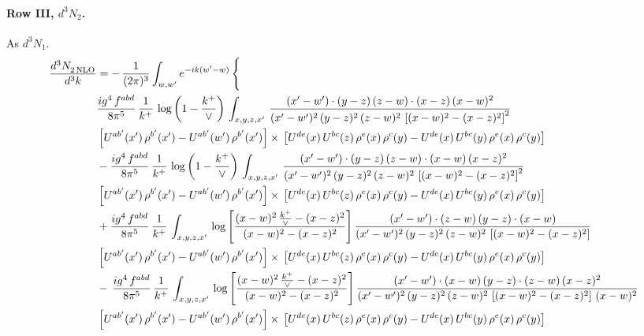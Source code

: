 \documentclass[10pt]{article}
\numberwithin{equation}{section}
\begin{document}
\paragraph{Row III, $d^3N_2$.}
As $d^3N_1$.
\begin{align}
   \frac{d^{3}N_{2\,\rm NLO}^{\rm}}{d^{3}k}  & =  -\,\frac{1}{(2\pi)^{3}}  \int_{w, w^\prime} e^{-ik(w^\prime-w)}\, \Bigg\{\notag \\
&  \frac{ig^{4}\, f^{abd}}{8\pi^{5}}\, \frac{1}{k^{+}}\,\log{\left(1-\frac{k^{+}}{\vee}\right)}\, \int_{x,y,z,x'}\,\frac{(x'-w')\cdot  (y-z)\, (z-w)\cdot (x-z)\, (x-w)^{2}}{(x'-w')^{2}\, (y-z)^{2}\, (z-w)^{2}\,\left[(x-w)^{2}-(x-z)^{2}\right]^{2}}\, \notag \\ & \left[U^{ab'}(x')\,\rho^{b'}(x')-U^{ab'}(w')\, \rho^{b'}(x')\right]\times\,\left[U^{de}(x)\,U^{bc}(z)\, \rho^{e}(x)\,\rho^{c}(y)-U^{de}(x)\,U^{bc}(y)\,\rho^{e}(x)\,\rho^{c}(y)\right] \notag \\
&   - \frac{ig^{4}\, f^{abd}}{8\pi^{5}}\, \frac{1}{k^{+}}\,\log{\left(1-\frac{k^{+}}{\vee}\right)}\, \int_{x,y,z,x'}\,\frac{(x'-w')\cdot  (y-z)\, (z-w)\cdot (x-w)\, (x-z)^{2}}{(x'-w')^{2}\, (y-z)^{2}\, (z-w)^{2}\,\left[(x-w)^{2}-(x-z)^{2}\right]^{2}}\, \notag \\ & \left[U^{ab'}(x')\,\rho^{b'}(x')-U^{ab'}(w')\, \rho^{b'}(x')\right]\times\,\left[U^{de}(x)\,U^{bc}(z)\, \rho^{e}(x)\,\rho^{c}(y)-U^{de}(x)\,U^{bc}(y)\,\rho^{e}(x)\,\rho^{c}(y)\right] \notag \\
&  + \frac{ig^{4}\, f^{abd}}{8\pi^{5}}\, \frac{1}{k^{+}}\, \int_{x,y,z,x'}\,\log{\left[\frac{(x-w)^{2}\,\frac{k^{+}}{\vee}-(x-z)^{2}}{(x-w)^{2}-(x-z)^{2}}\right]}\,\frac{(x'-w')\cdot (z-w)\, (y-z)\cdot (x-w)}{(x'-w')^{2}\, (y-z)^{2}\, (z-w)^{2}\,\left[(x-w)^{2}-(x-z)^{2}\right]}\, \notag \\ & \left[U^{ab'}(x')\,\rho^{b'}(x')-U^{ab'}(w')\, \rho^{b'}(x')\right]\times\,\left[U^{de}(x)\,U^{bc}(z)\, \rho^{e}(x)\,\rho^{c}(y)-U^{de}(x)\,U^{bc}(y)\,\rho^{e}(x)\,\rho^{c}(y)\right] \notag \\
& -\,\frac{ig^{4}\, f^{abd}}{8\pi^{5}}\, \frac{1}{k^{+}}\, \int_{x,y,z,x'}\,\log{\left[\frac{(x-w)^{2}\,\frac{k^{+}}{\vee}-(x-z)^{2}}{(x-w)^{2}-(x-z)^{2}}\right]}\,\frac{(x'-w')\cdot (x-w)\, (y-z)\cdot(z-w)\,(x-z)^{2}}{(x'-w')^{2}\, (y-z)^{2}\, (z-w)^{2}\,\left[(x-w)^{2}-(x-z)^{2}\right]\,(x-w)^{2}}\, \notag \\ & \left[U^{ab'}(x')\,\rho^{b'}(x')-U^{ab'}(w')\, \rho^{b'}(x')\right]\times\,\left[U^{de}(x)\,U^{bc}(z)\, \rho^{e}(x)\,\rho^{c}(y)-U^{de}(x)\,U^{bc}(y)\,\rho^{e}(x)\,\rho^{c}(y)\right] \notag \\

\end{align}
\end{document}
